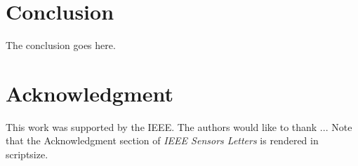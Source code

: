 \documentclass{IEEE_lsens}
\begin{document}
%
%



\section{Conclusion}
The conclusion goes here.



\section*{Acknowledgment}
\scriptsize
This work was supported by the IEEE. The authors would
like to thank ... Note that the Acknowledgment section of
\textit{IEEE Sensors Letters} is rendered in scriptsize.

\normalsize
\end{document}

